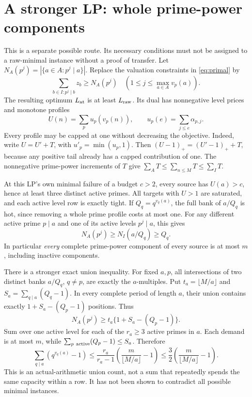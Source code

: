 \documentclass[11pt,a4paper]{article}
\theoremstyle{remark}\newtheorem{remark}[theorem]{Remark}
\newcommand{\LP}{L_{\rm raw}}
\newcommand{\atLP}{L_{\rm at}}
\begin{document}
\section{A stronger LP: whole prime-power components}

This is a separate possible route. Its necessary conditions must not
be assigned to a raw-minimal instance without a proof of transfer.
Let
\(N_A(p^j)=|\{a\in A:p^j\mid a\}|\). Replace the valuation constraints
in \eqref{eq:primal} by
\[
 \sum_{b\in I:p^j\mid b}z_b\ge N_A(p^j)
 \quad(1\le j\le\max_{a\in A}v_p(a)).
\]
The resulting optimum \(\atLP\) is at least \(\LP\). Its dual has
nonnegative level prices and monotone profiles
\[
 U(n)=\sum_p u_p(v_p(n)),\qquad
 u_p(e)=\sum_{j\le e}\alpha_{p,j}.
\]
Every profile may be capped at one without decreasing the objective.
Indeed, write \(U=U'+T\), with \(u'_p=\min(u_p,1)\). Then
\((U-1)_+=(U'-1)_++T\), because any positive tail already has a
capped contribution of one. The nonnegative prime-power increments
of \(T\) give \(\sum_A T\le\sum_{n\le M}T\le\sum_I T\).

At this LP's own minimal failure of a budget \(c>2\), every source
has \(U(a)>c\), hence at least three distinct active primes. All
targets with \(U>1\) are saturated, and each active level row is
exactly tight. If \(Q_q=q^{v_q(a)}\), the full bank of \(a/Q_q\)
is hot, since removing a whole prime profile costs at most one.
For any different active prime \(p\mid a\) and one of its active
levels \(p^j\mid a\), this gives
\begin{equation}
 N_A(p^j)\ge N_I(a/Q_q)\ge Q_q.
 \label{eq:componentm}
\end{equation}
In particular \emph{every} complete prime-power component of every
source is at most \(m\), including inactive components.

There is a stronger exact union inequality. For fixed \(a,p\), all
intersections of two distinct banks \(a/Q_q\), \(q\ne p\), are exactly
the \(a\)-multiples. Put
\(t_a=\lfloor M/a\rfloor\) and
\(S_a=\sum_{q\mid a}(Q_q-1)\). In every complete period of length
\(a\), their union contains exactly
\(1+S_a-(Q_p-1)\) positions. Thus
\begin{equation}
 N_A(p^j)\ge t_a\{1+S_a-(Q_p-1)\}.
 \label{eq:componentunion}
\end{equation}
Sum over one active level for each of the \(r_a\ge3\) active primes
in \(a\). Each demand is at most \(m\), while
\(\sum_{p\ {\rm active}}(Q_p-1)\le S_a\). Therefore
\begin{equation}
 \boxed{\quad
 \sum_{q\mid a}(q^{v_q(a)}-1)
 \le\frac{r_a}{r_a-1}\left(\frac m{\lfloor M/a\rfloor}-1\right)
 \le\frac32\left(\frac m{\lfloor M/a\rfloor}-1\right).
 \quad}\label{eq:componentsum}
\end{equation}
This is an actual-arithmetic union count, not a sum that repeatedly
spends the same capacity within a row. It has not been shown to
contradict all possible minimal instances.
\end{document}
